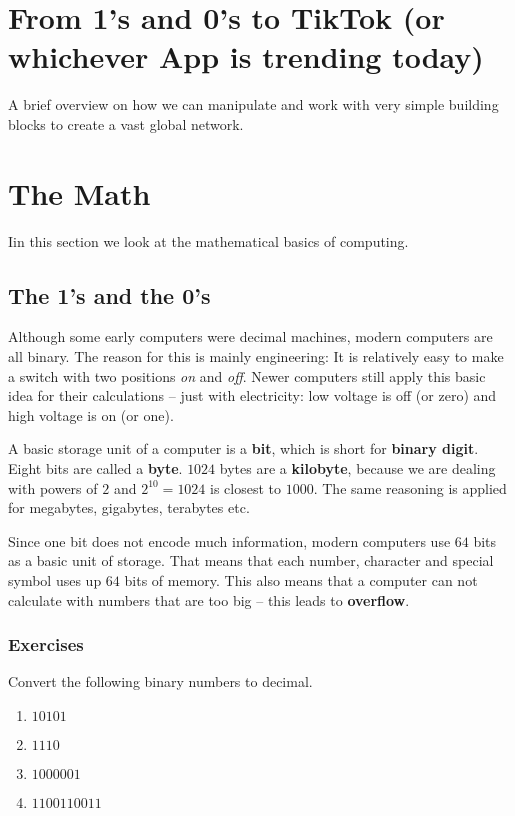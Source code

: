 \documentclass[11pt,a4paper]{report}
\newcommand{\bfb}[1]{{\bf \color{blue} #1}}
\begin{document}
\section*{From 1's and 0's to TikTok (or whichever App is trending today)}
A brief overview on how we can manipulate and work with very simple building blocks to create a vast global network. 
\section{The Math}
Iin this section we look at the mathematical basics of computing. 
\subsection{The 1's and the 0's}
Although some early computers were decimal machines, modern  computers are all binary. The reason for this is mainly engineering: It is relatively easy to make a switch with two positions \emph{on} and \emph{off}. Newer computers still apply this basic idea for their calculations -- just with electricity: low voltage is off (or zero) and high voltage is on (or one).

A basic storage unit of a computer is a \bfb{bit}, which is short for \bfb{binary digit}. Eight bits are called a \bfb{byte}. $1024$ bytes are a \bfb{kilobyte}, because we are dealing with powers of $2$ and $2^{10}=1024$ is closest to $1000$. The same reasoning is applied for megabytes, gigabytes, terabytes etc. 

Since one bit does not encode much information, modern computers use $64$ bits as a basic unit of storage. That means that each number, character and special symbol uses up $64$ bits of memory. This also means that a computer can not calculate with numbers that are too big -- this leads to \bfb{overflow}.

\newpage
\subsubsection{Exercises}

\begin{ex}
Convert the following binary numbers to decimal.
\begin{multicols}{4}
\begin{enumerate}
\item $10101$
\item $1110$
\item $1000001$
\item $1100110011$
\end{enumerate}
\end{multicols} 
\end{ex}
\end{document}
